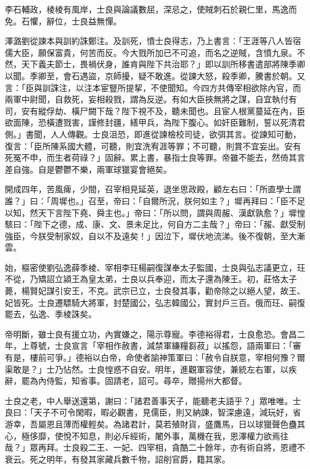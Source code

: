 \begin{pinyinscope}
 李石輔政，棱棱有風岸，士良與論議數屈，深忌之，使賊刺石於親仁里，馬逸而免。石懼，辭位，士良益無憚。



 澤潞劉從諫本與訓約誅鄭注。及訓死，憤士良得志，乃上書言：「王涯等八人皆宿儒大臣，願保富貴，何苦而反。今大戮所加已不可追，而名之逆賊，含憤九泉。不然，天下義夫節士，畏禍伏身，誰肯與陛下共治耶？」即以訓所移書遣部將陳季卿以聞。季卿至，會石遇盜，京師擾，疑不敢進。從諫大怒，殺季卿，騰書於朝。又言：「臣與訓誅注，以注本宦豎所提挈，不使聞知。今四方共傳宰相欲除內官，而兩軍中尉聞，自救死，妄相殺戮，謂為反逆。有如大臣挾無將之謀，自宜執付有司，安有縱俘劫、橫尸闕下哉？陛下視不及，聽未聞也。且宦人根黨蔓延在內，臣欲面陳，恐橫遭戮害，謹修封疆，繕甲兵，為陛下腹心。如奸臣難制，誓以死清君側。」書聞，人人傳觀。士良沮恐，即進從諫檢校司徒，欲弭其言。從諫知可動，復言：「臣所陳系國大體，可聽，則宜洗宥涯等罪；不可聽，則賞不宜妄出。安有死冤不申，而生者荷祿？」固辭。累上書，暴指士良等罪。帝雖不能去，然倚其言差自強。自是鬱鬱不樂，兩軍球獵宴會絕矣。



 開成四年，苦風痺，少間，召宰相見延英，退坐思政殿，顧左右曰：「所直學士謂誰？」曰：「周墀也。」召至，帝曰：「自爾所況，朕何如主？」墀再拜曰：「臣不足以知，然天下言陛下堯、舜主也。」帝曰：「所以問，謂與周赧、漢獻孰愈？」墀惶駭曰：「陛下之德，成、康、文、景未足比，何自方二主哉？」帝曰：「赧、獻受制強臣，今朕受制家奴，自以不及遠矣！」因泣下，墀伏地流涕。後不復朝，至大漸雲。



 始，樞密使劉弘逸薛季棱、宰相李玨楊嗣復謀奉太子監國，士良與弘志議更立，玨不從，乃矯詔立潁王為皇太弟，士良以兵奉迎，而太子還為陳王。初，莊恪太子薨，楊賢妃謀引安王，不克。武宗已立，士良發其事，勸帝除之以絕人望，故王、妃皆死。士良遷驃騎大將軍，封楚國公，弘志韓國公，實封戶三百。俄而玨、嗣復罷去，弘逸、季棱誅矣。



 帝明斷，雖士良有援立功，內實嫌之，陽示尊寵。李德裕得君，士良愈恐。會昌二年，上尊號，士良宣言「宰相作赦書，減禁軍縑糧芻菽」以搖怨，語兩軍曰：「審有是，樓前可爭。」德裕以白帝，命使者諭神策軍曰：「赦令自朕意，宰相何豫？爾渠敢是？」士乃怗然。士良惶惑不自安。明年，進觀軍容使，兼統左右軍，以疾辭，罷為內侍監，知省事。固請老，詔可。尋卒，贈揚州大都督。



 士良之老，中人舉送還第，謝曰：「諸君善事天子，能聽老夫語乎？」眾唯唯。士良曰：「天子不可令閑暇，暇必觀書，見儒臣，則又納諫，智深慮遠，減玩好，省游幸，吾屬恩且薄而權輕矣。為諸君計，莫若殖財貨，盛鷹馬，日以球獵聲色蠱其心，極侈靡，使悅不知息，則必斥經術，闍外事，萬機在我，恩澤權力欲焉往哉？」眾再拜。士良殺二王、一妃、四宰相，貪酷二十餘年，亦有術自將，恩禮不衰云。死之明年，有發其家藏兵數千物，詔削官爵，籍其家。




\end{pinyinscope}
